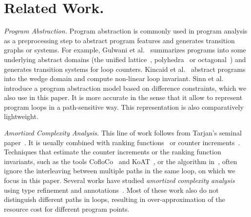 \section{Related Work.}
\emph{Program Abstraction.}
Program abstraction is commonly used in program analysis as a preprocessing step to abstract program features and generates transition graphs or systems. For example, Gulwani et al.~\cite{GulwaniZ10} summarizes programs into some underlying abstract domains (the unified lattice~\cite{CousotH78}, polyhedra~\cite{CousotC77} or octagonal~\cite{Mine06})
and generates transition systems for loop counters. Kincaid et al.~\cite{KincaidCBR18} abstract  programs into the wedge domain and compute non-linear loop invariant.
Sinn et al.~\cite{SinnZV17,SinnZV14}
introduce a program abstraction model based on difference constraints, which we also use in this paper. 
It is more accurate in the sense that it allow to represent program loops in a path-sensitive way.
 This representation is also comparatively lightweight.

\emph{Amortized Complexity Analysis.}
This line of work follows 
from Tarjan's seminal paper~\cite{Tarjan85}. It is usually combined with ranking functions~\cite{BradleyMS05,CookSZ13,Zuleger18} or counter increments~\cite{GulwaniMC09,ZulegerGSV11,AliasDFG10}.
 Techniques that estimate the counter increments or the ranking function invariants, such as the tools CofloCo~\cite{Montoya17,Flores-MontoyaH14,Flores-Montoya16} and KoAT~\cite{BrockschmidtEFFG16,BrockschmidtEFFG14,FalkeKS12,FalkeKS11}, or the algorithm in~\cite{LuCT21}, often ignore the interleaving between multiple paths in the same loop, on which we focus in this paper.
Several works have studied \emph{amortized complexity analysis} using type refinement and annotations~\cite{CraryW00,JostHLH10,CicekBG0H17,RajaniG0021,CarbonneauxHS15}. Most of these work also do not distinguish different paths in loops, resulting in over-approximation of the resource cost for different program points.

